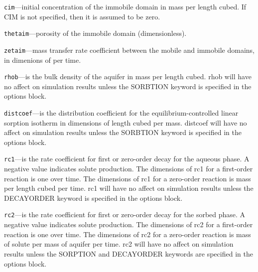 \begin{description}
\item \texttt{cim}---initial concentration of the immobile domain in mass per length cubed.  If CIM is not specified, then it is assumed to be zero.

\item \texttt{thetaim}---porosity of the immobile domain (dimensionless).

\item \texttt{zetaim}---mass transfer rate coefficient between the mobile and immobile domains, in dimenions of per time.

\item \texttt{rhob}---is the bulk density of the aquifer in mass per length cubed.  rhob will have no affect on simulation results unless the SORBTION keyword is specified in the options block.

\item \texttt{distcoef}---is the distribution coefficient for the equilibrium-controlled linear sorption isotherm in dimensions of length cubed per mass.  distcoef will have no affect on simulation results unless the SORBTION keyword is specified in the options block.

\item \texttt{rc1}---is the rate coefficient for first or zero-order decay for the aqueous phase.  A negative value indicates solute production.  The dimensions of rc1 for a first-order reaction is one over time.  The dimensions of rc1 for a zero-order reaction is mass per length cubed per time.  rc1 will have no affect on simulation results unless the DECAYORDER keyword is specified in the options block.

\item \texttt{rc2}---is the rate coefficient for first or zero-order decay for the sorbed phase.  A negative value indicates solute production.  The dimensions of rc2 for a first-order reaction is one over time.  The dimensions of rc2 for a zero-order reaction is mass of solute per mass of aquifer per time.  rc2 will have no affect on simulation results unless the SORPTION and DECAYORDER keywords are specified in the options block.

\end{description}


